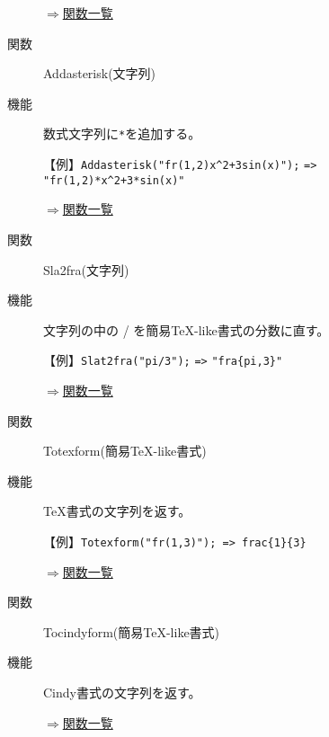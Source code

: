 \documentclass[papersize,a4paper,10pt,uplatex]{jsarticle}
\begin{document}
\begin{description}
\begin{flushright}\hyperlink{functionlist}{$\Rightarrow$関数一覧}\end{flushright}

\vspace{\baselineskip}

\hypertarget{addasterisk}{}
\item[関数]Addasterisk(文字列)
\item[機能]数式文字列に\verb|*|を追加する。

\vspace{\baselineskip}

【例】\verb|Addasterisk("fr(1,2)x^2+3sin(x)");| \verb|=>| \verb|"fr(1,2)*x^2+3*sin(x)" |

\begin{flushright}\hyperlink{functionlist}{$\Rightarrow$関数一覧}\end{flushright}

\vspace{\baselineskip}

\hypertarget{sla2fra}{}
\item[関数]Sla2fra(文字列)
\item[機能]文字列の中の / を簡易TeX-like書式の分数に直す。

\vspace{\baselineskip}

【例】\verb|Slat2fra("pi/3");| \verb|=>| \verb|"fra{pi,3}"| 

\begin{flushright}\hyperlink{functionlist}{$\Rightarrow$関数一覧}\end{flushright}

\vspace{\baselineskip}
\hypertarget{totexform}{}
\item[関数]Totexform(簡易TeX-like書式)
\item[機能]TeX書式の文字列を返す。

\vspace{\baselineskip}
【例】\verb|Totexform("fr(1,3)"); => frac{1}{3}|

\begin{flushright}\hyperlink{functionlist}{$\Rightarrow$関数一覧}\end{flushright}

\vspace{\baselineskip}
\hypertarget{tocindyform}{}
\item[関数]Tocindyform(簡易TeX-like書式)
\item[機能]Cindy書式の文字列を返す。

\begin{flushright}\hyperlink{functionlist}{$\Rightarrow$関数一覧}\end{flushright}

\end{description}
\newpage
\end{document}
